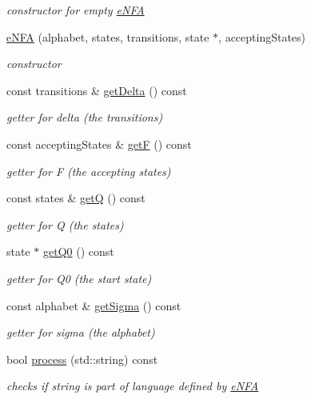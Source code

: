 \begin{DoxyCompactItemize}
\begin{DoxyCompactList}\small\item\em constructor for empty \hyperlink{classFA_1_1eNFA}{e\-N\-F\-A} \end{DoxyCompactList}\item 
\hyperlink{classFA_1_1eNFA_a68c12a639d585778c1fd354230a90145}{e\-N\-F\-A} (alphabet, states, transitions, state $\ast$, accepting\-States)
\begin{DoxyCompactList}\small\item\em constructor \end{DoxyCompactList}\item 
const transitions \& \hyperlink{classFA_1_1eNFA_add867593442ff1f1f78f0adabb62383d}{get\-Delta} () const 
\begin{DoxyCompactList}\small\item\em getter for delta (the transitions) \end{DoxyCompactList}\item 
const accepting\-States \& \hyperlink{classFA_1_1eNFA_ac3dcbe3e615312ec1f1d4e826a1bfb36}{get\-F} () const 
\begin{DoxyCompactList}\small\item\em getter for F (the accepting states) \end{DoxyCompactList}\item 
const states \& \hyperlink{classFA_1_1eNFA_aa11a17ac63deed8fb605b993e0971c85}{get\-Q} () const 
\begin{DoxyCompactList}\small\item\em getter for Q (the states) \end{DoxyCompactList}\item 
state $\ast$ \hyperlink{classFA_1_1eNFA_ae54015ed6c95f0f58b792599315da8de}{get\-Q0} () const 
\begin{DoxyCompactList}\small\item\em getter for Q0 (the start state) \end{DoxyCompactList}\item 
const alphabet \& \hyperlink{classFA_1_1eNFA_aad2759b9b0b1ff3ff66b4d2a7a5fe984}{get\-Sigma} () const 
\begin{DoxyCompactList}\small\item\em getter for sigma (the alphabet) \end{DoxyCompactList}\item 
bool \hyperlink{classFA_1_1eNFA_a9f3cae2ce7da666b24401fd582cfcd9a}{process} (std\-::string) const 
\begin{DoxyCompactList}\small\item\em checks if string is part of language defined by \hyperlink{classFA_1_1eNFA}{e\-N\-F\-A} \end{DoxyCompactList}\item 

\end{DoxyCompactItemize}
